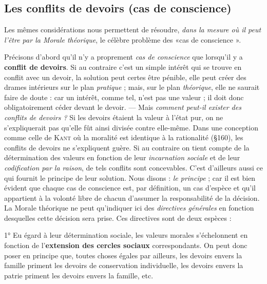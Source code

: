 \subsection{Les conflits de devoirs (cas de conscience)}%
Les mêmes
considérations nous permettent de résoudre, {\it dans la mesure où il
peut l'être par la Morale théorique}, le célèbre problème des «cas de
conscience ».

Précisons d’abord qu’il n’y a proprement {\it cas de conscience} que
lorsqu'il y a {\bf conflit de devoirs}. Si au contraire c’est un simple intérêt
qui se trouve en conflit avec un devoir, la solution peut certes être
pénible, elle peut créer des drames intérieurs sur le plan {\it pratique} ;
mais, sur le plan {\it théorique}, elle ne saurait faire de doute : car un intérêt,
comme tel, n’est pas une valeur ; il doit donc obligatoirement
céder devant le devoir. — Mais {\it comment peut-il exister des conflits de
devoirs ?} Si les devoirs étaient la valeur à l’état pur, on ne s’expliquerait
pas qu’elle fût ainsi divisée contre elle-même. Dans une conception
comme celle de \textsc{Kant} où la moralité est identique à la rationalité
(\S 160), les conflits de devoirs ne s’expliquent guère. Si au contraire
on tient compte de la détermination des valeurs en fonction de
leur {\it incarnation sociale} et de leur {\it codification par la raison}, de tels
conflits sont concevables. C’est d’ailleurs aussi ce qui fournit le principe
de leur solution. Nous disons : {\it le principe} ; car il est bien évident
que chaque cas de conscience est, par définition, un cas d’espèce
et qu’il appartient à la volonté libre de chacun d’assumer la responsabilité
de la décision. La Morale théorique ne peut qu’indiquer ici des
{\it directives générales} en fonction desquelles cette décision sera prise.
Ces directives sont de deux espèces :

1° Eu égard à leur détermination sociale, les valeurs morales
s’échelonnent en fonction de l’{\bf extension des cercles sociaux} correspondants.
On peut donc poser en principe que, toutes choses égales
par ailleurs, les devoirs envers la famille priment les devoirs de conservation
individuelle, les devoirs envers la patrie priment les devoirs
envers la famille, etc.

